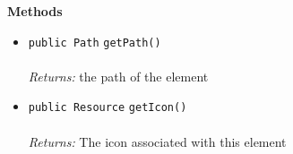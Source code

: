 \textbf{\sffamily Methods}
\begin{itemize}
\item \lstinline|public Path| \lstinline|getPath|\lstinline|()|\\ \\[-0.6em]
\emph{Returns:} the path of the element



\item \lstinline|public Resource| \lstinline|getIcon|\lstinline|()|\\ \\[-0.6em]
\emph{Returns:} The icon associated with this element



\end{itemize}


